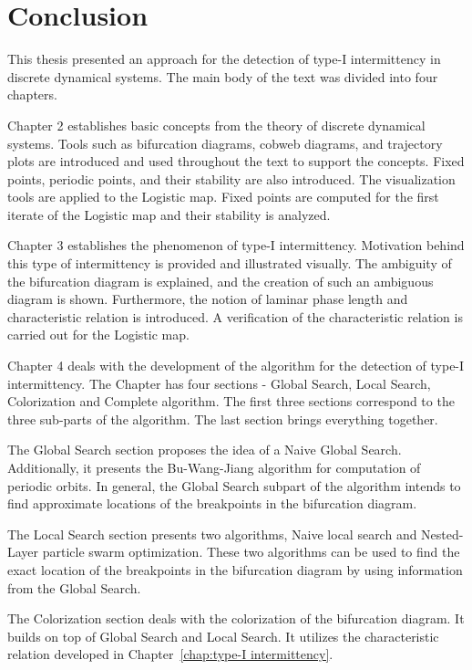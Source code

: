 \chapter{Conclusion}

This thesis presented an approach for the detection of type-I intermittency in discrete dynamical systems.
The main body of the text was divided into four chapters.
\par
Chapter 2 establishes basic concepts from the theory of discrete dynamical systems.
Tools such as bifurcation diagrams, cobweb diagrams, and trajectory plots are introduced and used throughout the text to support the concepts.
Fixed points, periodic points, and their stability are also introduced.
The visualization tools are applied to the Logistic map.
Fixed points are computed for the first iterate of the Logistic map and their stability is analyzed.
\par
Chapter 3 establishes the phenomenon of type-I intermittency.
Motivation behind this type of intermittency is provided and illustrated visually.
The ambiguity of the bifurcation diagram is explained, and the creation of such an ambiguous diagram is shown.
Furthermore, the notion of laminar phase length and characteristic relation is introduced.
A verification of the characteristic relation is carried out for the Logistic map.
\par
Chapter 4 deals with the development of the algorithm for the detection of type-I intermittency.
The Chapter has four sections - Global Search, Local Search, Colorization and Complete algorithm.
The first three sections correspond to the three sub-parts of the algorithm.
The last section brings everything together.
\par
The Global Search section proposes the idea of a Naive Global Search.
Additionally, it presents the Bu-Wang-Jiang algorithm for computation of periodic orbits.
In general, the Global Search subpart of the algorithm intends to find approximate locations of the breakpoints in the bifurcation diagram.
\par
The Local Search section presents two algorithms, Naive local search and Nested-Layer particle swarm optimization.
These two algorithms can be used to find the exact location of the breakpoints in the bifurcation diagram by using information from the Global Search.
\par
The Colorization section deals with the colorization of the bifurcation diagram.
It builds on top of Global Search and Local Search.
It utilizes the characteristic relation developed in Chapter~\ref{chap:type-I intermittency}.
